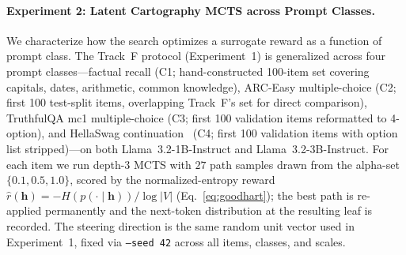 \paragraph{Experiment 2: Latent Cartography MCTS across Prompt Classes.}\label{sec:exp2}
We characterize how the search optimizes a surrogate reward as a function of prompt class. The Track~F protocol (Experiment~1) is generalized across four prompt classes---factual recall (C1; hand-constructed 100-item set covering capitals, dates, arithmetic, common knowledge), ARC-Easy multiple-choice (C2; first 100 test-split items, overlapping Track~F's set for direct comparison), TruthfulQA mc1 multiple-choice (C3; first 100 validation items reformatted to 4-option), and HellaSwag continuation~\cite{zellers2019hellaswag} (C4; first 100 validation items with option list stripped)---on both Llama~3.2-1B-Instruct and Llama~3.2-3B-Instruct. For each item we run depth-$3$ MCTS with $27$ path samples drawn from the alpha-set $\{0.1, 0.5, 1.0\}$, scored by the normalized-entropy reward $\hat{r}(\mathbf{h}) = -H(p(\cdot \mid \mathbf{h})) / \log|V|$ (Eq.~\ref{eq:goodhart}); the best path is re-applied permanently and the next-token distribution at the resulting leaf is recorded. The steering direction is the same random unit vector used in Experiment~1, fixed via \texttt{--seed 42} across all items, classes, and scales.


